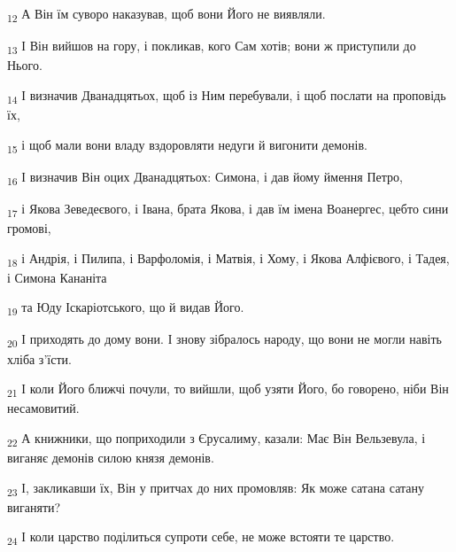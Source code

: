 \begin{tcolorbox}
\textsubscript{12} А Він їм суворо наказував, щоб вони Його не виявляли.
\end{tcolorbox}
\begin{tcolorbox}
\textsubscript{13} І Він вийшов на гору, і покликав, кого Сам хотів; вони ж приступили до Нього.
\end{tcolorbox}
\begin{tcolorbox}
\textsubscript{14} І визначив Дванадцятьох, щоб із Ним перебували, і щоб послати на проповідь їх,
\end{tcolorbox}
\begin{tcolorbox}
\textsubscript{15} і щоб мали вони владу вздоровляти недуги й вигонити демонів.
\end{tcolorbox}
\begin{tcolorbox}
\textsubscript{16} І визначив Він оцих Дванадцятьох: Симона, і дав йому ймення Петро,
\end{tcolorbox}
\begin{tcolorbox}
\textsubscript{17} і Якова Зеведеєвого, і Івана, брата Якова, і дав їм імена Воанергес, цебто сини громові,
\end{tcolorbox}
\begin{tcolorbox}
\textsubscript{18} і Андрія, і Пилипа, і Варфоломія, і Матвія, і Хому, і Якова Алфієвого, і Тадея, і Симона Кананіта
\end{tcolorbox}
\begin{tcolorbox}
\textsubscript{19} та Юду Іскаріотського, що й видав Його.
\end{tcolorbox}
\begin{tcolorbox}
\textsubscript{20} І приходять до дому вони. І знову зібралось народу, що вони не могли навіть хліба з'їсти.
\end{tcolorbox}
\begin{tcolorbox}
\textsubscript{21} І коли Його ближчі почули, то вийшли, щоб узяти Його, бо говорено, ніби Він несамовитий.
\end{tcolorbox}
\begin{tcolorbox}
\textsubscript{22} А книжники, що поприходили з Єрусалиму, казали: Має Він Вельзевула, і виганяє демонів силою князя демонів.
\end{tcolorbox}
\begin{tcolorbox}
\textsubscript{23} І, закликавши їх, Він у притчах до них промовляв: Як може сатана сатану виганяти?
\end{tcolorbox}
\begin{tcolorbox}
\textsubscript{24} І коли царство поділиться супроти себе, не може встояти те царство.
\end{tcolorbox}
